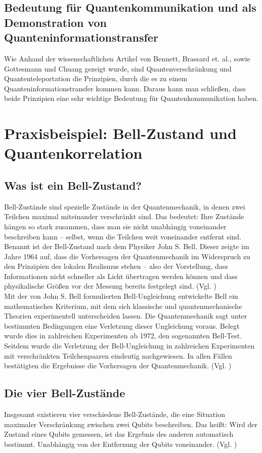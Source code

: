 \subsection{Bedeutung für Quantenkommunikation und als Demonstration von Quanteninformationstransfer}
Wie Anhand der wissenschaftlichen Artikel von Bennett, Brassard et. al., sowie Gottesmann und Chuang gezeigt wurde, sind Quantenverschränkung und Quantenteleportation die Prinzipien, durch die es zu einem Quanteninformationstransfer kommen kann. Daraus kann man schließen, dass beide Prinzipien eine sehr wichtige Bedeutung für Quantenkommunikation haben.

\section{Praxisbeispiel: Bell-Zustand und Quantenkorrelation}
\subsection{Was ist ein Bell-Zustand?}
Bell-Zustände sind spezielle Zustände in der Quantenmechanik, in denen zwei Teilchen maximal miteinander verschränkt sind. Das bedeutet: Ihre Zustände hängen so stark zusammen, dass man sie nicht unabhängig voneinander beschreiben kann – selbst, wenn die Teilchen weit voneinander entfernt sind. Benannt ist der Bell-Zustand nach dem Physiker John S. Bell. Dieser zeigte im Jahre 1964 auf, dass die Vorhersagen der Quantenmechanik im Widerspruch zu den Prinzipien des lokalen Realismus stehen – also der Vorstellung, dass Informationen nicht schneller als Licht übertragen werden können und dass physikalische Größen vor der Messung bereits festgelegt sind. (Vgl. \cite[S.195]{bell_einstein_1964})
\\


Mit der von John S. Bell formulierten Bell-Ungleichung entwickelte Bell ein mathematisches Kriterium, mit dem sich klassische und quantenmechanische Theorien experimentell unterscheiden lassen. Die Quantenmechanik sagt unter bestimmten Bedingungen eine Verletzung dieser Ungleichung voraus. Belegt wurde dies in zahlreichen Experimenten ab 1972, den sogenannten Bell-Test. Seitdem wurde die Verletzung der Bell-Ungleichung in zahlreichen Experimenten mit verschränkten Teilchenpaaren eindeutig nachgewiesen. In allen Fällen bestätigten die Ergebnisse die Vorhersagen der Quantenmechanik. 
(Vgl. \cite[S.53-59]{homeister_quantum_2022})

\subsection{Die vier Bell-Zustände}
Insgesamt existieren vier verschiedene Bell-Zustände, die eine Situation maximaler Verschränkung zwischen zwei Qubits beschreiben. Das heißt: Wird der Zustand eines Qubits gemessen, ist das Ergebnis des anderen automatisch bestimmt. Unabhängig von der Entfernung der Qubits voneinander. (Vgl. \cite[S.53-55]{homeister_quantum_2022}) 
\\


